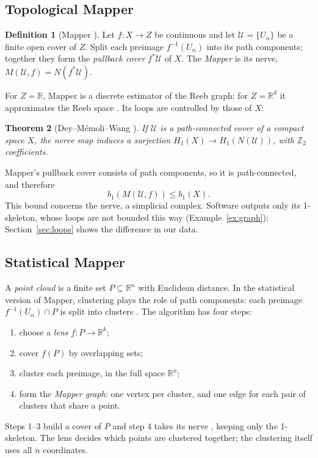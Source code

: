 \documentclass{article}
\newcommand{\R}{\mathbb{R}}
\newcommand{\Z}{\mathbb{Z}}
\newtheorem{theorem}{Theorem}[section]
\theoremstyle{definition}
\newtheorem{definition}[theorem]{Definition}
\theoremstyle{remark}
\begin{document}
\subsection{Topological Mapper}
\begin{definition}[Mapper {\parencite{singh2007mapper,deymemoliwang2017}}]
Let $f : X \to Z$ be continuous and let $\mathcal U = \{U_\alpha\}$ be a finite open cover of $Z$.
Split each preimage $f^{-1}(U_\alpha)$ into its path components; together they form the \emph{pullback cover} $f^*\mathcal U$ of $X$.
The \emph{Mapper} is its nerve, $M(\mathcal U, f) = N(f^*\mathcal U)$.
\end{definition}
For $Z = \R$, Mapper is a discrete estimator of the Reeb graph; for $Z = \R^d$ it approximates the Reeb space \parencite{carrieremicheloudot2018,munchwang2016}.
Its loops are controlled by those of $X$:

\begin{theorem}[Dey--M\'emoli--Wang {\parencite{deymemoliwang2017}}]\label{thm:dmw}
If $\mathcal U$ is a path-connected cover of a compact space $X$, the nerve map induces a surjection $H_1(X) \to H_1(N(\mathcal U))$, with $\Z_2$ coefficients.
\end{theorem}
Mapper's pullback cover consists of path components, so it is path-connected, and therefore
\begin{equation}\label{eq:mapper-b1}
  b_1(M(\mathcal U, f)) \le b_1(X).
\end{equation}
This bound concerns the nerve, a simplicial complex. Software outputs only its 1-skeleton, whose loops are not bounded this way (Example~\ref{ex:graph}); Section~\ref{sec:loops} shows the difference in our data.

\subsection{Statistical Mapper}
A \emph{point cloud} is a finite set $P \subseteq \R^n$ with Euclidean distance.
In the statistical version of Mapper, clustering plays the role of path components: each preimage $f^{-1}(U_\alpha) \cap P$ is split into clusters \parencite{singh2007mapper}.
The algorithm has four steps:
\begin{enumerate}
  \item choose a \emph{lens} $f : P \to \R^k$;
  \item cover $f(P)$ by overlapping sets;
  \item cluster each preimage, in the full space $\R^n$;
  \item form the \emph{Mapper graph}: one vertex per cluster, and one edge for each pair of clusters that share a point.
\end{enumerate}
Steps 1--3 build a cover of $P$ and step 4 takes its nerve \parencite{singh2007mapper}, keeping only the 1-skeleton.
The lens decides which points are clustered together; the clustering itself uses all $n$ coordinates.
\end{document}
